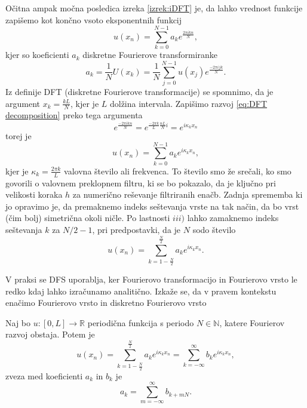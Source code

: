 \documentclass[mat2, tisk]{fmfdelo}
\newcommand{\R}{\mathbb R}
\newcommand{\N}{\mathbb N}
\begin{document}
Očitna ampak močna posledica izreka \ref{izrek:iDFT} je, da lahko 
vrednost funkcije zapišemo kot končno vsoto eksponentnih funkcij 
\begin{equation}
  \label{eq:DFT decomposition}
u(x_n) = \sum_{k=0}^{N-1} a_k e^{\frac{2\pi i k n}{N}},
\end{equation}
kjer so koeficienti $a_k$ diskretne Fourierove transformiranke 
\begin{equation}
a_k = \frac{1}{N} U(x_k) = \frac{1}{N} \sum_{j=0}^{N-1} u(x_j) e^{\frac{-2\pi i j k}{N}}.
\end{equation}
Iz definije DFT (diskretne Fourierove transformacije) se spomnimo, da je 
argument $x_k = \frac{k L}{N}$, kjer je $L$ dolžina intervala. Zapišimo 
razvoj \ref{eq:DFT decomposition} preko tega argumenta 
$$
e^{\frac{-2\pi i k n}{N}} = e^{\frac{-2\pi k}{L}\frac{nL}{N}i} = e^{i\kappa_k x_n}
$$
torej je 
\begin{equation}
u(x_n) = \sum_{k=0}^{N-1} a_k e^{i\kappa_k x_n},
\end{equation}
kjer je $\kappa_k = \frac{2\pi k}{L}$ valovna število ali frekvenca.
To število smo že srečali, ko smo govorili o valovnem preklopnem 
filtru, ki se bo pokazalo, da je ključno pri velikosti koraka $h$ 
za numerično reševanje filtriranih enačb. Zadnja sprememba ki 
jo opravimo je, da premaknemo indeks seštevanja vrste na tak način, da bo vrst (čim bolj) simetrična okoli ničle. 
Po lastnosti $iii)$ lahko zamaknemo indeks seštevanja $k$ za $N/2 - 1$, pri 
predpostavki, da je $N$ sodo število
\begin{equation}
  \label{eq:DFS expantion}
u(x_n) = \sum_{k=1-\frac{N}{2}}^{\frac{N}{2}} a_k e^{i\kappa_k x_n}.
\end{equation} 

V praksi se DFS uporablja, ker Fourierovo transformacijo in 
Fourierovo vrsto le redko kdaj lahko izračunamo analitično.
Izkaže se, da v pravem kontekstu enačimo Fourierovo vrsto in diskretno Fourierovo vrsto
\begin{izrek}
Naj bo $u: [0, L] \rightarrow \R$ periodična funkcija s periodo $N\in \N$, katere Fourierov 
razvoj obstaja. Potem je 
\begin{equation}
u(x_n) = \sum_{k=1-\frac{N}{2}}^{\frac{N}{2}} a_k e^{i\kappa_k x_n} =
\sum_{k=-\infty}^{\infty} b_k e^{i\kappa_k x_n},
\end{equation}
zveza med koeficienti $a_k$ in $b_k$ je
\begin{equation}
  a_k = \sum_{m=-\infty}^{\infty} b_{k + mN}. 
\end{equation}
\end{izrek}
\end{document}
